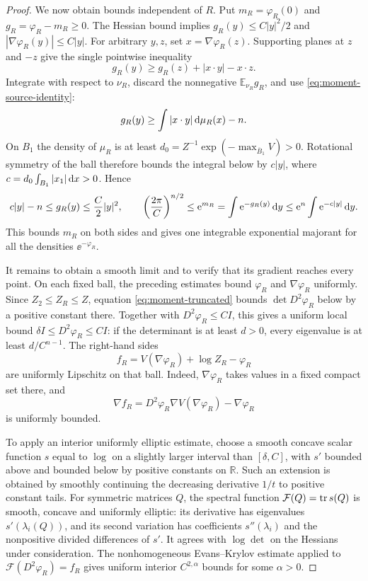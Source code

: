\begin{proof}
We now obtain bounds independent of $R$.  Put $m_R=\varphi_R(0)$ and $g_R=\varphi_R-m_R\ge0$. The Hessian bound implies $g_R(y)\le C|y|^2/2$ and $|\nabla\varphi_R(y)|\le C|y|$. For arbitrary $y,z$, set $x=\nabla\varphi_R(z)$.  Supporting planes at $z$ and $-z$ give the single pointwise inequality
\[
 g_R(y)\ge g_R(z)+|x\cdot y|-x\cdot z.
\]
Integrate with respect to $\nu_R$, discard the nonnegative $\mathbb{E}_{\nu_R}g_R$, and use \eqref{eq:moment-source-identity}:
\[
 g_R(y)\ge\int|x\cdot y|\,\mathrm{d} \mu_R(x)-n.
\]
On $B_1$ the density of $\mu_R$ is at least $d_0=Z^{-1}\exp(-\max_{\overline B_1}V)>0$. Rotational symmetry of the ball therefore bounds the integral below by $c|y|$, where $c=d_0\int_{B_1}|x_1|\,\mathrm{d} x>0$.  Hence
\begin{equation}\label{eq:moment-coercivity}
 c|y|-n\le g_R(y)\le\frac C2|y|^2,
 \qquad
 \left(\frac{2\pi}{C}\right)^{n/2}
 \le \mathrm{e}^{m_R}=\int \mathrm{e}^{-g_R(y)}\,\mathrm{d} y
 \le \mathrm{e}^n\int \mathrm{e}^{-c|y|}\,\mathrm{d} y.
\end{equation}
This bounds $m_R$ on both sides and gives one integrable exponential majorant for all the densities $\ee^{-\varphi_R}$.

It remains to obtain a smooth limit and to verify that its gradient reaches every point.  On each fixed ball, the preceding estimates bound $\varphi_R$ and $\nabla\varphi_R$ uniformly.  Since $Z_2\le Z_R\le Z$, equation \eqref{eq:moment-truncated} bounds $\det D^2\varphi_R$ below by a positive constant there. Together with $D^2\varphi_R\le CI$, this gives a uniform local bound $\delta I\le D^2\varphi_R\le CI$: if the determinant is at least $d>0$, every eigenvalue is at least $d/C^{n-1}$. The right-hand sides
\[
 f_R=V(\nabla\varphi_R)+\log Z_R-\varphi_R
\]
are uniformly Lipschitz on that ball. Indeed, $\nabla\varphi_R$ takes values in a fixed compact set there, and
\[
 \nabla f_R=D^2\varphi_R\nabla V(\nabla\varphi_R)-\nabla\varphi_R
\]
is uniformly bounded.

To apply an interior uniformly elliptic estimate, choose a smooth concave scalar function $s$ equal to $\log$ on a slightly larger interval than $[\delta,C]$, with $s'$ bounded above and bounded below by positive constants on $\mathbb{R}$.  Such an extension is obtained by smoothly continuing the decreasing derivative $1/t$ to positive constant tails.  For symmetric matrices $Q$, the spectral function $\mathcal{F}(Q)=\tr s(Q)$ is smooth, concave and uniformly elliptic: its derivative has eigenvalues $s'(\lambda_i(Q))$, and its second variation has coefficients $s''(\lambda_i)$ and the nonpositive divided differences of $s'$.  It agrees with $\log\det$ on the Hessians under consideration.  The nonhomogeneous Evans--Krylov estimate \cite[Corollary~2.3]{Wang2012} applied to $\mathcal{F}(D^2\varphi_R)=f_R$ gives uniform interior $C^{2,\alpha}$ bounds for some $\alpha>0$.


\end{proof}
